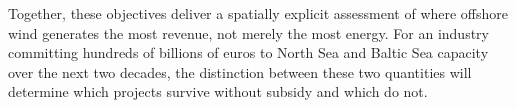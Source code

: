 Together, these objectives deliver a spatially explicit assessment of where offshore wind generates the most revenue, not merely the most energy. For an industry committing hundreds of billions of euros to North Sea and Baltic Sea capacity over the next two decades, the distinction between these two quantities will determine which projects survive without subsidy and which do not.
